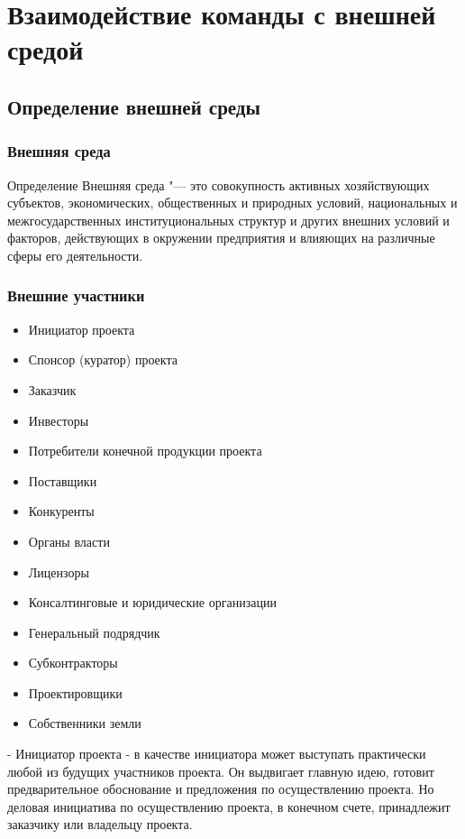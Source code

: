 \documentclass{../industrial-development}
\begin{document}
\section{Взаимодействие команды с внешней средой}

\subsection{Определение внешней среды}
\begin{frame} \frametitle{Внешняя среда}
	\begin{block}{Определение}
		\alert{Внешняя среда} "--- это совокупность активных хозяйствующих субъектов, экономических, общественных и природных условий, национальных и межгосударственных институциональных структур и других внешних условий и факторов, действующих в окружении предприятия и влияющих на различные сферы его деятельности.
	\end{block}
\end{frame}

\begin{frame} \frametitle{Внешние участники}
	\begin{itemize}
		\item Инициатор проекта
		\item Спонсор (куратор) проекта
		\item Заказчик
		\item Инвесторы
		\item Потребители конечной продукции проекта
		\item Поставщики
		\item Конкуренты
		\item Органы власти
		\item Лицензоры
		\item Консалтинговые и юридические организации 
		\item Генеральный подрядчик
		\item Субконтракторы
		\item Проектировщики
		\item Собственники земли
	\end{itemize}
\end{frame}

\lecturenotes
- Инициатор проекта - в качестве инициатора может выступать практически любой из будущих участников проекта. Он выдвигает главную идею, готовит предварительное обоснование и предложения по осуществлению проекта. Но деловая инициатива по осуществлению проекта, в конечном счете, принадлежит заказчику или владельцу проекта.
\end{document}
